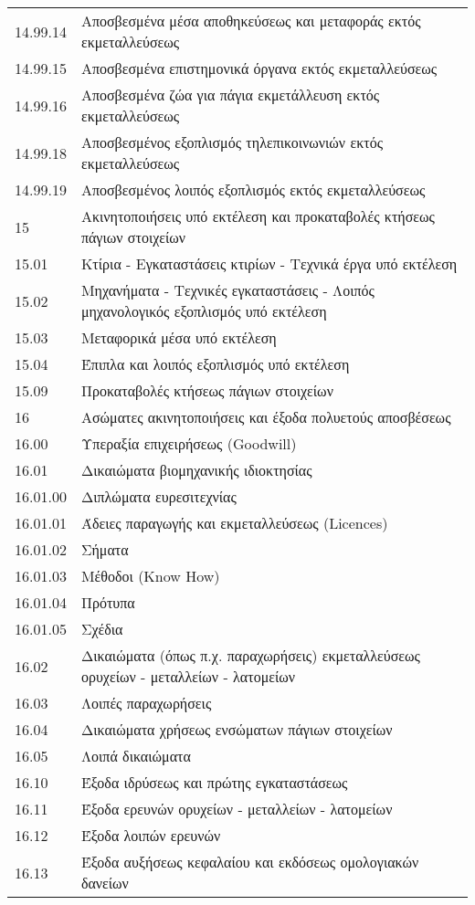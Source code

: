 \documentclass[A4,10pt,greek]{book}
\begin{document}
\begin{tabularx}{\linewidth}{lX}
14.99.14 & Αποσβεσμένα μέσα αποθηκεύσεως και μεταφοράς εκτός εκμεταλλεύσεως\\
14.99.15 & Αποσβεσμένα επιστημονικά όργανα εκτός εκμεταλλεύσεως\\
14.99.16 & Αποσβεσμένα ζώα για πάγια εκμετάλλευση εκτός εκμεταλλεύσεως\\
14.99.18 & Αποσβεσμένος εξοπλισμός τηλεπικοινωνιών εκτός εκμεταλλεύσεως\\
14.99.19 & Αποσβεσμένος λοιπός εξοπλισμός εκτός εκμεταλλεύσεως\\
15 & Ακινητοποιήσεις υπό εκτέλεση και προκαταβολές κτήσεως πάγιων στοιχείων\\
15.01 & Κτίρια - Εγκαταστάσεις κτιρίων - Τεχνικά έργα υπό εκτέλεση\\
15.02 & Μηχανήματα - Τεχνικές εγκαταστάσεις - Λοιπός μηχανολογικός εξοπλισμός υπό εκτέλεση\\
15.03 & Μεταφορικά μέσα υπό εκτέλεση\\
15.04 & Έπιπλα και λοιπός εξοπλισμός υπό εκτέλεση\\
15.09 & Προκαταβολές κτήσεως πάγιων στοιχείων\\
16 & Ασώματες ακινητοποιήσεις και έξοδα πολυετούς αποσβέσεως\\
16.00 & Υπεραξία επιχειρήσεως (Goodwill)\\
16.01 & Δικαιώματα βιομηχανικής ιδιοκτησίας\\
16.01.00 & Διπλώματα ευρεσιτεχνίας\\
16.01.01 & Άδειες παραγωγής και εκμεταλλεύσεως (Licences)\\
16.01.02 & Σήματα\\
16.01.03 & Μέθοδοι (Know How)\\
16.01.04 & Πρότυπα\\
16.01.05 & Σχέδια\\
16.02 & Δικαιώματα (όπως π.χ. παραχωρήσεις) εκμεταλλεύσεως ορυχείων - μεταλλείων - λατομείων\\
16.03 & Λοιπές παραχωρήσεις\\
16.04 & Δικαιώματα χρήσεως ενσώματων πάγιων στοιχείων\\
16.05 & Λοιπά δικαιώματα\\
16.10 & Έξοδα ιδρύσεως και πρώτης εγκαταστάσεως\\
16.11 & Έξοδα ερευνών ορυχείων - μεταλλείων - λατομείων\\
16.12 & Έξοδα λοιπών ερευνών\\
16.13 & Έξοδα αυξήσεως κεφαλαίου και εκδόσεως ομολογιακών δανείων\\

\end{tabularx}
\end{document}
